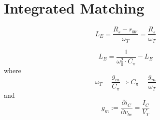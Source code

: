\documentclass[10pt,a4paper]{article}
\begin{document}
\section{Integrated Matching}

\[
L_E = \frac{R_s - r_{bb'}}{\omega_T} = \frac{R_s}{\omega_T} 
\]

\[
L_B = \frac{1}{\omega_0^2 \cdot C_{\pi}} - L_E %
\]
where 
\[
\omega_T = \frac{g_m}{C_{\pi}} \Rightarrow C_{\pi} = \frac{g_m}{\omega_T}
\]
and 
\[
g_m := \frac{\partial i_C}{\partial v_{be}} = \frac{I_C}{V_T }
\]
\end{document}

